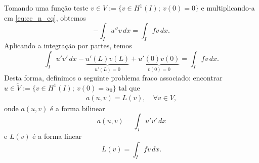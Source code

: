 Tomando uma função teste $v\in V:=\{v\in H^1(I);~v(0)=0\}$ e multiplicando-a em \eqref{eq:cc_n_eq}, obtemos
\begin{equation}
  - \int_I u''v\,dx = \int_I fv\,dx.
\end{equation}
Aplicando a integração por partes, temos
\begin{equation}
  \int_I u'v'\,dx - \underbrace{u'(L)v(L)}_{u'(L)=0} + \underbrace{u'(0)v(0)}_{v(0)=0} = \int_I fv\,dx.
\end{equation}
Desta forma, definimos o seguinte problema fraco associado: encontrar $u\in \tilde{V} := \{v\in H^1(I);~v(0)=u_0\}$ tal que
\begin{align}
  a(u,v) = L(v),\quad\forall v\in V,
\end{align}
onde $a(u,v)$ é a forma bilinear
\begin{equation}\label{eq:cc_n_bilinear}
  a(u,v) = \int_I u'v'\,dx
\end{equation}
e $L(v)$ é a forma linear
\begin{equation}\label{eq:cc_n_linear}
  L(v) = \int_I fv\,dx.
\end{equation}

